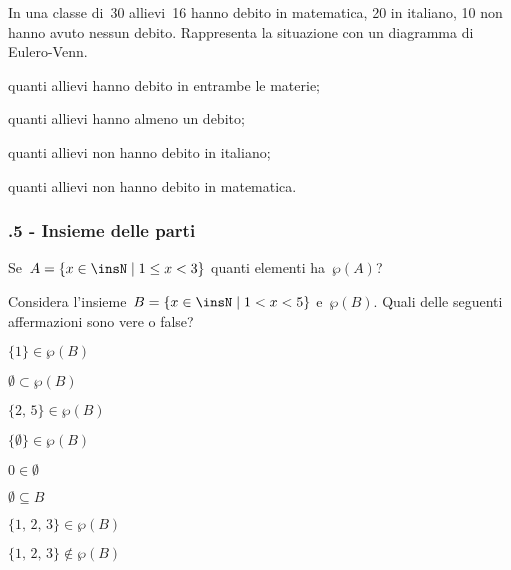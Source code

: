 \begin{esercizio}[\Ast]
\label{ese:\thechapter.46}
In una classe di~30 allievi~16 hanno debito in matematica, 20 in
italiano, 10 non hanno avuto nessun debito. Rappresenta la situazione
con un diagramma di Eulero-Venn.

\begin{enumeratea}
\item quanti allievi hanno debito in entrambe le materie;
\item quanti allievi hanno almeno un debito;
\item quanti allievi non hanno debito in italiano;
\item quanti allievi non hanno debito in matematica.
\end{enumeratea}
\end{esercizio}

\subsubsection*{\thechapter.5 - Insieme delle parti}
\begin{esercizio}
\label{ese:\thechapter.47}
Se~$A=\{x\in\insN\mid 1\le x<3\}$ quanti elementi ha~$\wp (A)$?
\end{esercizio}
\pagebreak
\begin{esercizio}
 \label{ese:\thechapter.48}
Considera l'insieme~$B=\{x\in\insN\mid 1<x<5\}$
e~$\wp (B)$. Quali delle seguenti affermazioni sono vere o false?
\begin{multicols}{2}
\TabPositions{4cm}
\begin{enumeratea}
 \item $\{1\}\in\wp (B)$ \tab\boxV\quad\boxF
 \item $\emptyset\subset\wp (B)$ \tab\boxV\quad\boxF
 \item $\{\text{2, 5}\}\in\wp (B)$ \tab\boxV\quad\boxF
 \item $\{\emptyset\}\in\wp (B)$ \tab\boxV\quad\boxF
 \item $0\in\emptyset $ \tab\boxV\quad\boxF
 \item $\emptyset\subseteq B$ \tab\boxV\quad\boxF
 \item $\{\text{1, 2, 3}\}\in\wp (B)$ \tab\boxV\quad\boxF
 \item $\{\text{1, 2, 3}\}\notin\wp (B)$ \tab\boxV\quad\boxF
\end{enumeratea}
\end{multicols}
\end{esercizio}

